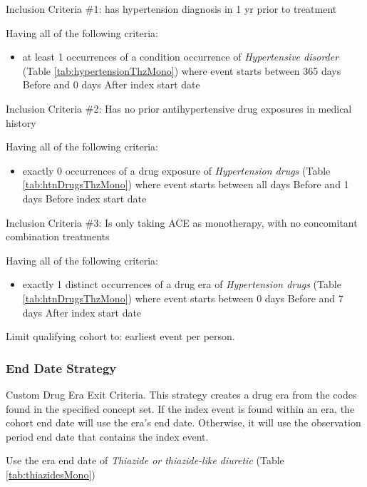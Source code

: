 \documentclass[11pt]{book}
\providecommand{\tightlist}{%
  \setlength{\itemsep}{0pt}\setlength{\parskip}{0pt}}
\theoremstyle{definition}
\theoremstyle{definition}
\theoremstyle{definition}
\theoremstyle{remark}
\begin{document}
Inclusion Criteria \#1: has hypertension diagnosis in 1 yr prior to
treatment

Having all of the following criteria:

\begin{itemize}
\tightlist
\item
  at least 1 occurrences of a condition occurrence of \emph{Hypertensive
  disorder} (Table \ref{tab:hypertensionThzMono}) where event starts
  between 365 days Before and 0 days After index start date
\end{itemize}

Inclusion Criteria \#2: Has no prior antihypertensive drug exposures in
medical history

Having all of the following criteria:

\begin{itemize}
\tightlist
\item
  exactly 0 occurrences of a drug exposure of \emph{Hypertension drugs}
  (Table \ref{tab:htnDrugsThzMono}) where event starts between all days
  Before and 1 days Before index start date
\end{itemize}

Inclusion Criteria \#3: Is only taking ACE as monotherapy, with no
concomitant combination treatments

Having all of the following criteria:

\begin{itemize}
\tightlist
\item
  exactly 1 distinct occurrences of a drug era of \emph{Hypertension
  drugs} (Table \ref{tab:htnDrugsThzMono}) where event starts between 0
  days Before and 7 days After index start date
\end{itemize}

Limit qualifying cohort to: earliest event per person.

\subsubsection*{End Date Strategy}\label{end-date-strategy-4}

Custom Drug Era Exit Criteria. This strategy creates a drug era from the
codes found in the specified concept set. If the index event is found
within an era, the cohort end date will use the era's end date.
Otherwise, it will use the observation period end date that contains the
index event.

Use the era end date of \emph{Thiazide or thiazide-like diuretic} (Table
\ref{tab:thiazidesMono})
\end{document}
